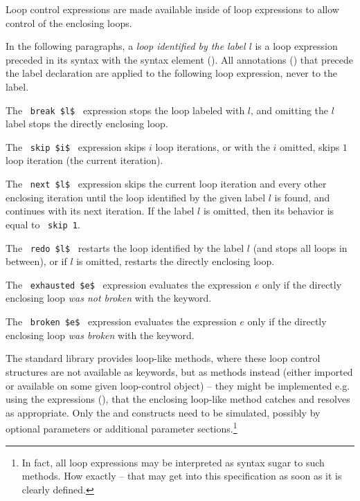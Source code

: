 Loop control expressions are made available inside of loop expressions to allow control of the enclosing loops.

In the following paragraphs, a {\em loop identified by the label $l$} is a loop expression preceded in its syntax with the syntax element  (). All annotations () that precede the label declaration are applied to the following loop expression, never to the label. 

The ~\lstinline!break $l$!~ expression stops the loop labeled with $l$, and omitting the $l$ label stops the directly enclosing loop. 

The ~\lstinline!skip $i$!~ expression skips $i$ loop iterations, or with the $i$ omitted, skips $1$ loop iteration (the current iteration). 

The ~\lstinline!next $l$!~ expression skips the current loop iteration and every other enclosing iteration until the loop identified by the given label $l$ is found, and continues with its next iteration. If the label $l$ is omitted, then its behavior is equal to ~\lstinline!skip 1!. 

The ~\lstinline!redo $l$!~ restarts the loop identified by the label $l$ (and stops all loops in between), or if $l$ is omitted, restarts the directly enclosing loop. 

The ~\lstinline!exhausted $e$!~ expression evaluates the expression $e$ only if the directly enclosing loop {\em was not broken} with the  keyword. 

The ~\lstinline!broken $e$!~ expression evaluates the expression $e$ only if the directly enclosing loop {\em was broken} with the  keyword. 

The standard library provides loop-like methods, where these loop control structures are not available as keywords, but as methods instead (either imported or available on some given loop-control object) -- they might be implemented e.g. using the  expressions (), that the enclosing loop-like method catches and resolves as appropriate. Only the  and  constructs need to be simulated, possibly by optional parameters or additional parameter sections.\footnote{In fact, all loop expressions may be interpreted as syntax sugar to such methods. How exactly -- that may get into this specification as soon as it is clearly defined.} 





